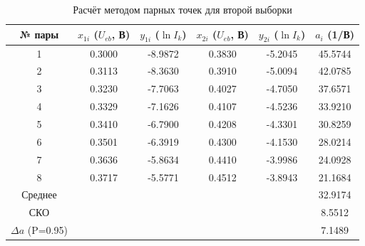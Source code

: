 \begin{table}[h]
\centering
\caption{Расчёт методом парных точек для второй выборки}
\label{tab:pairs2}
\begin{tabular}{|c|c|c|c|c|c|}
\hline
№ пары & $x_{1i}$ ($U_{eb}$, В) & $y_{1i}$ ($\ln I_k$) & $x_{2i}$ ($U_{eb}$, В) & $y_{2i}$ ($\ln I_k$) & $a_i$ (1/В) \\
\hline
1 & 0.3000 & -8.9872 & 0.3830 & -5.2045 & 45.5744 \\
2 & 0.3113 & -8.3630 & 0.3910 & -5.0094 & 42.0785 \\
3 & 0.3230 & -7.7063 & 0.4027 & -4.7050 & 37.6571 \\
4 & 0.3329 & -7.1626 & 0.4107 & -4.5236 & 33.9210 \\
5 & 0.3410 & -6.7900 & 0.4208 & -4.3301 & 30.8259 \\
6 & 0.3501 & -6.3919 & 0.4300 & -4.1530 & 28.0214 \\
7 & 0.3636 & -5.8634 & 0.4410 & -3.9986 & 24.0928 \\
8 & 0.3717 & -5.5771 & 0.4512 & -3.8943 & 21.1684 \\
\hline
Среднее & & & & & 32.9174 \\
СКО & & & & & 8.5512 \\
$\Delta a$ (P=0.95) & & & & & 7.1489 \\
\hline
\end{tabular}
\end{table}
